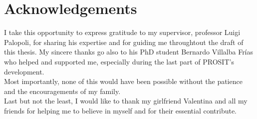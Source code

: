 \chapter*{Acknowledgements}\label{chp:acknowledgements}

I take this opportunity to express gratitude to my supervisor, professor Luigi Palopoli, for sharing his expertise and for guiding me throughtout the draft of this thesis. My sincere thanks go also to his PhD student Bernardo Villalba Frías who helped and supported me, especially during the last part of PROSIT's development.\\
Most importantly, none of this would have been possible without the patience and the encouragements of my family.\\
Last but not the least, I would like to thank my girlfriend Valentina and all my friends for helping me to believe in myself and for their essential contribute.